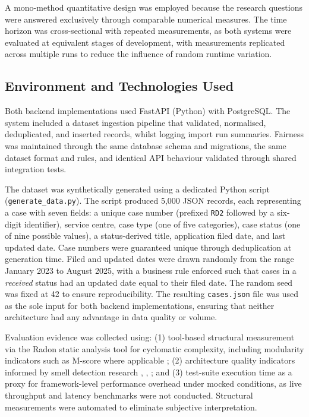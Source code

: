 \documentclass[conference]{IEEEtran}
\begin{document}
A mono-method quantitative design was employed because the research questions were answered exclusively through comparable numerical measures. The time horizon was cross-sectional with repeated measurements, as both systems were evaluated at equivalent stages of development, with measurements replicated across multiple runs to reduce the influence of random runtime variation.

\subsection{Environment and Technologies Used}
Both backend implementations used FastAPI (Python) with PostgreSQL. The system included a dataset ingestion pipeline that validated, normalised, deduplicated, and inserted records, whilst logging import run summaries. Fairness was maintained through the same database schema and migrations, the same dataset format and rules, and identical API behaviour validated through shared integration tests.

The dataset was synthetically generated using a dedicated Python script (\texttt{generate\_data.py}). The script produced 5{,}000 JSON records, each representing a case with seven fields: a unique case number (prefixed \texttt{RD2} followed by a six-digit identifier), service centre, case type (one of five categories), case status (one of nine possible values), a status-derived title, application filed date, and last updated date. Case numbers were guaranteed unique through deduplication at generation time. Filed and updated dates were drawn randomly from the range January 2023 to August 2025, with a business rule enforced such that cases in a \textit{received} status had an updated date equal to their filed date. The random seed was fixed at 42 to ensure reproducibility. The resulting \texttt{cases.json} file was used as the sole input for both backend implementations, ensuring that neither architecture had any advantage in data quality or volume. 

Evaluation evidence was collected using: (1) tool-based structural measurement via the Radon static analysis tool for cyclomatic complexity, including modularity indicators such as M-score where applicable \cite{b4}; (2) architecture quality indicators informed by smell detection research \cite{b1}, \cite{b3}, \cite{b6}; and (3) test-suite execution time as a proxy for framework-level performance overhead under mocked conditions, as live throughput and latency benchmarks were not conducted. Structural measurements were automated to eliminate subjective interpretation.
\end{document}
